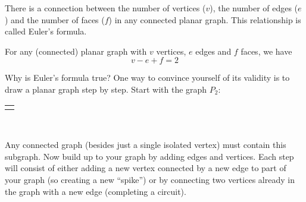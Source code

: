 \documentclass[10pt,]{book}
\theoremstyle{plain}
\theoremstyle{definition}
\theoremstyle{definition}
\theoremstyle{definition}
\theoremstyle{definition}
\numberwithin{equation}{chapter}
\newlength{\panelmax}
\newcommand{\vtx}[2]{node[fill,circle,inner sep=0pt, minimum size=4pt,label=#1:#2]{}}
\renewcommand{\v}{\vtx{above}{}}
\begin{document}
\par
\hypertarget{p-1597}{}%
There is a connection between the number of vertices (\(v\)), the number of edges (\(e\)) and the number of faces (\(f\)) in any connected planar graph. This relationship is called Euler's formula.%
\begin{assemblage}\label{assemblage-40}
\hypertarget{p-1598}{}%
 For any (connected) planar graph with \(v\) vertices, \(e\) edges and \(f\) faces, we have%
\begin{equation*}
v-e + f = 2
\end{equation*}
%
\end{assemblage}
\hypertarget{p-1599}{}%
Why is Euler's formula true? One way to convince yourself of its validity is to draw a planar graph step by step. Start with the graph \(P_2\):%
{%
\setlength{\panelmax}{0pt}
\ifdefined\panelboxAimage\else\newsavebox{\panelboxAimage}\fi%
\begin{lrbox}{\panelboxAimage}
\resizebox{0.1\linewidth}{!}{{
\begin{tikzpicture}
      \draw (-.5,-.5) \v -- (.5,.5)\v;
    \end{tikzpicture}
}
}\end{lrbox}
\ifdefined\phAimage\else\newlength{\phAimage}\fi%
\setlength{\phAimage}{\ht\panelboxAimage+\dp\panelboxAimage}
\settototalheight{\phAimage}{\usebox{\panelboxAimage}}
\setlength{\panelmax}{\maxof{\panelmax}{\phAimage}}
\leavevmode%
\setlength{\tabcolsep}{0\linewidth}
\par\medskip\noindent
\hspace*{0.45\linewidth}%
\begin{tabular}{@{}*{1}{c}@{}}
\begin{minipage}[c][\panelmax][t]{0.1\linewidth}\usebox{\panelboxAimage}\end{minipage}\end{tabular}\\
}%
\par
\hypertarget{p-1600}{}%
Any connected graph (besides just a single isolated vertex) must contain this subgraph. Now build up to your graph by adding edges and vertices. Each step will consist of either adding a new vertex connected by a new edge to part of your graph (so creating a new ``spike'') or by connecting two vertices already in the graph with a new edge (completing a circuit).%
\end{document}
